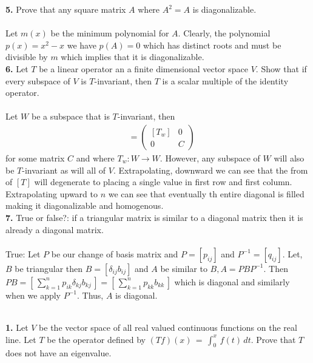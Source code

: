 \documentclass[11pt]{amsart}
\theoremstyle{definition}  %
\begin{document}
\newpage
\vskip 0.1cm
\noindent
{\bf 5.} Prove that any square matrix $A$ where $A^2 = A$ is diagonalizable. \\
\\
Let $m(x)$ be the minimum polynomial for $A$.  Clearly, the polynomial $p(x)=x^2-x$ we have $p(A)=0$ which has distinct roots and must be divisible by $m$ which implies that it is diagonalizable.
\\

\vskip 0.1cm
\noindent
{\bf 6.} Let $T$ be a linear operator an a finite dimensional vector space $V$. Show that if  every subspace of $V$ is $T$-invariant, then $T$ is a scalar multiple of the identity operator.\\
\\
Let $W$ be a subspace that is $T$-invariant, then 
\begin{align*}
	[T]&= \left(\begin{array}{cc}
		[T_w] & 0 \\
		0 & C
\end{array}	 \right)
\end{align*}for some matrix $C$ and where $T_w: W \to W$.  However, any subspace of $W$ will also be $T$-invariant as will all of $V$.  Extrapolating, downward we can see that the from of $[T]$ will degenerate to placing a single value in first row and first column.  Extrapolating upward to $n$ we can see that eventually th entire diagonal is filled making it diagonalizable and homogenous.\\

\vskip 0.1cm
\noindent
{\bf 7.}  True or false?: if a triangular matrix is similar to a diagonal matrix then it is already a diagonal matrix.\\
\\
True: Let $P$ be our change of basis matrix and $P=[p_{ij}]$ and $P^{-1}=[q_{ij}]$.  Let, $B$ be triangular then $B=[\delta_{ij}b_{ij}]$ and $A$ be similar to $B, A = PBP^{-1}$.  Then $PB = \left [\,\sum_{k=1}^n p_{ik}\delta_{kj}b_{kj}\,\right ]=\left[\,\sum_{k=1}^n p_{kk}b_{kk}\,\right ]$ which is diagonal and similarly when we apply $P^{-1}$.  Thus, $A$ is diagonal.






\vfill
\eject
{}\\
{\bf 1.} Let $V$ be the vector space of all real valued continuous functions on the real line. Let $T$ be the operator defined by $(Tf)(x) \, = \, \int_0^x \, f(t) \, dt$. Prove 
that $T$ does not have an eigenvalue. \\
\end{document}
